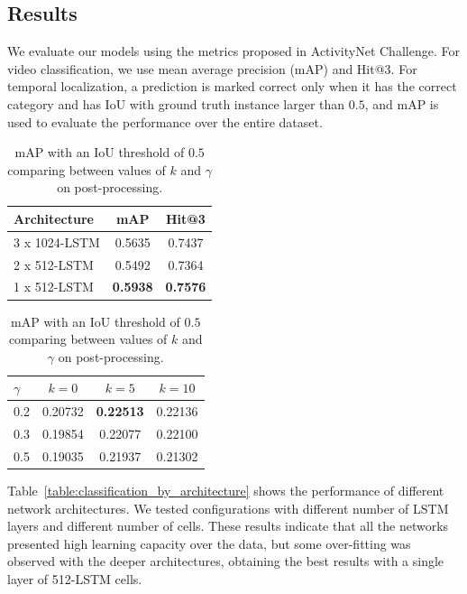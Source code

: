 \documentclass{article}
\begin{document}
\subsection{Results}
\label{sec:resultats}

We evaluate our models using the metrics proposed in ActivityNet Challenge. For video classification, we use mean average precision (mAP) and Hit@3. For temporal localization, a prediction is marked correct only when it has the correct category and has IoU with ground truth instance larger than $0.5$, and mAP is used to evaluate the performance over the entire dataset.

\begin{table}[h]
    \parbox{.45\linewidth}{
        \centering
        \begin{tabular}{l|cc}
        \textbf{Architecture} & \textbf{mAP} & \textbf{Hit@3} \\
        \hline
        3 x 1024-LSTM & 0.5635 & 0.7437 \\
        2 x 512-LSTM & 0.5492 & 0.7364 \\
        1 x 512-LSTM & \bf0.5938 & \bf0.7576 \\
        \end{tabular}
        \vspace{.5cm}
        \caption{Results for classification task comparing different architectures.}
        \label{table:classification_by_architecture}
    }
    \hfill
    \parbox{.45\linewidth}{
        \centering
        \begin{tabular}{l|ccc}
        \textbf{$\gamma$} & \textbf{$k=0$} & \textbf{$k=5$} & \textbf{$k=10$} \\
        \hline
        0.2 & 0.20732 & \bf0.22513 & 0.22136 \\
        0.3 & 0.19854 & 0.22077 & 0.22100 \\
        0.5 & 0.19035 & 0.21937 & 0.21302 \\
        \end{tabular}
        \vspace{.2cm}
        \caption{mAP with an IoU threshold of $0.5$ comparing between values of $k$ and $\gamma$ on post-processing.}
        \label{table:detection_postprocessing_comparison}
    }
\end{table}

Table~\ref{table:classification_by_architecture} shows the performance of different network architectures. We tested configurations with different number of LSTM layers and different number of cells. These results indicate that all the networks presented high learning capacity over the data, but some over-fitting was observed with the deeper architectures, obtaining the best results with a single layer of 512-LSTM cells.
\end{document}
